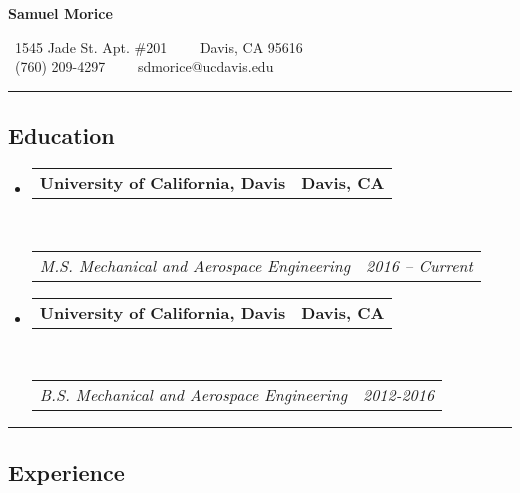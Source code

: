 \documentclass[10pt,letterpaper]{article}
\makeatletter
\newcommand{\headerrow}[2]
{\begin{tabular*}{\linewidth}{l@{\extracolsep{\fill}}r}
	#1 &
	#2 \\
\end{tabular*}}
\makeatother
\begin{document}
\begin{center}
{\LARGE \textbf{Samuel Morice}}

\ 1545 Jade St. Apt. \#201\ \ \textbullet
\ \ Davis, CA 95616
\\
\ (760) 209-4297\ \ \textbullet
\ \ sdmorice@ucdavis.edu
\end{center}

\hrule
\vspace{-0.4em}
\subsection*{Education}

\begin{itemize}
	\parskip=0.1em

	\item
	\headerrow
		{\textbf{University of California, Davis}}
		{\textbf{Davis, CA}}
	\\
	\headerrow
		{\emph{M.S. Mechanical and Aerospace Engineering}}
		{\emph{2016 -- Current}}

	\item
	\headerrow
		{\textbf{University of California, Davis}}
		{\textbf{Davis, CA}}
	\\
	\headerrow
		{\emph{B.S. Mechanical and Aerospace Engineering}}
		{\emph{2012-2016}}
	
\end{itemize}

\hrule
\vspace{-0.4em}
\subsection*{Experience}
\end{document}
